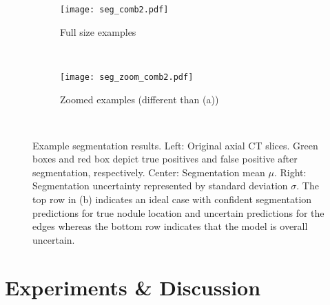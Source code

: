 \documentclass{article}
\begin{document}
\begin{figure}[h!]
	\centering
	\begin{subfigure}[b]{0.49\textwidth}
		\texttt{[image: seg\_comb2.pdf]}
		\caption{Full size examples}
		\label{fig:seg_ex_orig}
	\end{subfigure}
	~ %
	\begin{subfigure}[b]{0.49\textwidth}
		\texttt{[image: seg\_zoom\_comb2.pdf]}
		\caption{Zoomed examples (different than (a))}
		\label{fig:seg_ex_zoom}
	\end{subfigure}
	\vspace{-.25cm}
	~ %
	\caption{Example segmentation results. Left: Original axial CT slices. Green boxes and red box depict true positives and false positive after segmentation, respectively. Center: Segmentation mean $\mu$. Right: Segmentation uncertainty represented by standard deviation $\sigma$. The top row in (b) indicates an ideal case with confident segmentation predictions for true nodule location and uncertain predictions for the edges whereas the bottom row indicates that the model is overall uncertain.}\label{fig:seg_ex}\vspace{-.25cm}
\end{figure}


\section{Experiments \& Discussion}\label{sec:res}%
\end{document}
